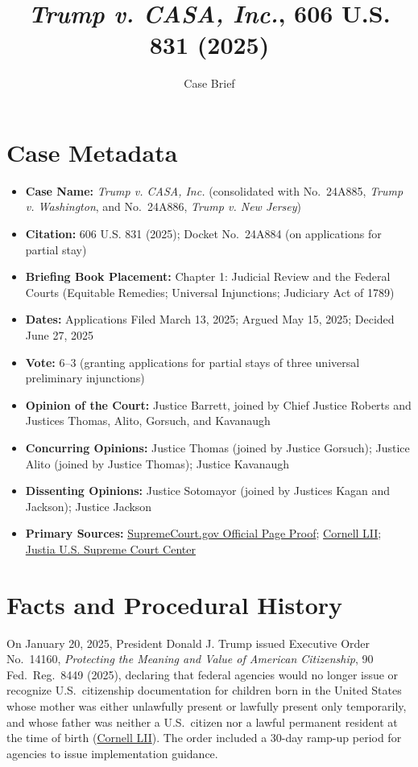 \documentclass[12pt]{article}
\title{\textit{Trump v. CASA, Inc.}, 606 U.S. 831 (2025)}
\author{Case Brief}
\date{}
\begin{document}
\maketitle

\section{Case Metadata}

\begin{itemize}
  \item \textbf{Case Name:} \textit{Trump v. CASA, Inc.} (consolidated with No.\ 24A885, \textit{Trump v. Washington}, and No.\ 24A886, \textit{Trump v. New Jersey})
  \item \textbf{Citation:} 606 U.S. 831 (2025); Docket No.\ 24A884 (on applications for partial stay)
  \item \textbf{Briefing Book Placement:} Chapter 1: Judicial Review and the Federal Courts (Equitable Remedies; Universal Injunctions; Judiciary Act of 1789)
  \item \textbf{Dates:} Applications Filed March 13, 2025; Argued May 15, 2025; Decided June 27, 2025
  \item \textbf{Vote:} 6--3 (granting applications for partial stays of three universal preliminary injunctions)
  \item \textbf{Opinion of the Court:} Justice Barrett, joined by Chief Justice Roberts and Justices Thomas, Alito, Gorsuch, and Kavanaugh
  \item \textbf{Concurring Opinions:} Justice Thomas (joined by Justice Gorsuch); Justice Alito (joined by Justice Thomas); Justice Kavanaugh
  \item \textbf{Dissenting Opinions:} Justice Sotomayor (joined by Justices Kagan and Jackson); Justice Jackson
  \item \textbf{Primary Sources:} \href{https://www.supremecourt.gov/opinions/24pdf/606us2r66_j426.pdf}{SupremeCourt.gov Official Page Proof}; \href{https://www.law.cornell.edu/supremecourt/text/24A884}{Cornell LII}; \href{https://supreme.justia.com/cases/federal/us/606/24a884/}{Justia U.S. Supreme Court Center}
\end{itemize}

\section{Facts and Procedural History}

On January 20, 2025, President Donald J. Trump issued Executive Order No.\ 14160, \textit{Protecting the Meaning and Value of American Citizenship}, 90 Fed.\ Reg.\ 8449 (2025), declaring that federal agencies would no longer issue or recognize U.S.\ citizenship documentation for children born in the United States whose mother was either unlawfully present or lawfully present only temporarily, and whose father was neither a U.S.\ citizen nor a lawful permanent resident at the time of birth (\href{https://www.law.cornell.edu/supremecourt/text/24A884}{Cornell LII}). The order included a 30-day ramp-up period for agencies to issue implementation guidance.
\end{document}
